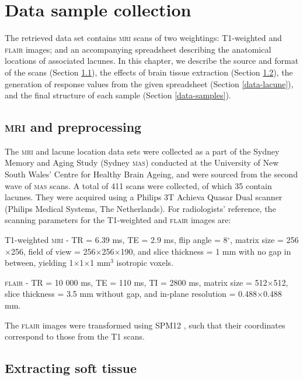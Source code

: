 


\chapter{Data sample collection}\label{data}

The retrieved data set contains \textsc{mri} scans of two weightings: T1-weighted and \textsc{flair} images; and an accompanying spreadsheet describing the anatomical locations of associated lacunes. In this chapter, we describe the source and format of the scans (Section \ref{data-mri}), the effects of brain tissue extraction (Section \ref{data-soft}), the generation of response values from the given spreadsheet (Section \ref{data-lacune}), and the final structure of each sample (Section \ref{data-samples}).

\section{\textsc{mri} and preprocessing}\label{data-mri}

The \textsc{mri} and lacune location data sets were collected as a part of the Sydney Memory and Aging Study (Sydney \textsc{mas}) conducted at the University of New South Wales' Centre for Healthy Brain Ageing, and were sourced from the second wave of \textsc{mas} scans. A total of 411 scans were collected, of which 35 contain lacunes. They were acquired using a Philips 3T Achieva Quasar Dual scanner (Philips Medical Systems, The Netherlands). For radiologists' reference, the scanning parameters for the T1-weighted and \textsc{flair} images are:

T1-weighted \textsc{mri} - TR = 6.39 ms, TE = 2.9 ms, flip angle = 8$^\circ$, matrix size = 256$\times$256, field of view = 256$\times$256$\times$190, and slice thickness = 1 mm with no gap in between, yielding 1$\times$1$\times$1 mm$^3$ isotropic voxels.

\textsc{flair} - TR = 10 000 ms, TE = 110 ms, TI = 2800 ms, matrix size = 512$\times$512, slice thickness = 3.5 mm without gap, and in-plane resolution = 0.488$\times$0.488 mm.

The \textsc{flair} images were transformed using SPM12 \citeyearpar{spm12}, such that their coordinates correspond to those from the T1 scans.

\section{Extracting soft tissue}\label{data-soft}

